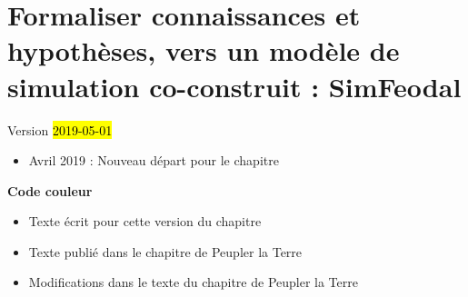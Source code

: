 \chapter{Formaliser connaissances et hypothèses, vers un modèle de simulation co-construit : SimFeodal}
\label{chap:chap2}
\begin{center}
	{\large Version \hl{2019-05-01}}
\end{center}

\begin{itemize}
	\item Avril 2019 : Nouveau départ pour le chapitre
\end{itemize}
\setcounter{minitocdepth}{1}

	\minitoc


\textbf{Code couleur}
\begin{itemize}
	\item Texte écrit pour cette version du chapitre
	\item {\redroman Texte publié dans le chapitre de Peupler la Terre}
	\item {\blueroman Modifications dans le texte du chapitre de Peupler la Terre}
\end{itemize}

\clearpage


